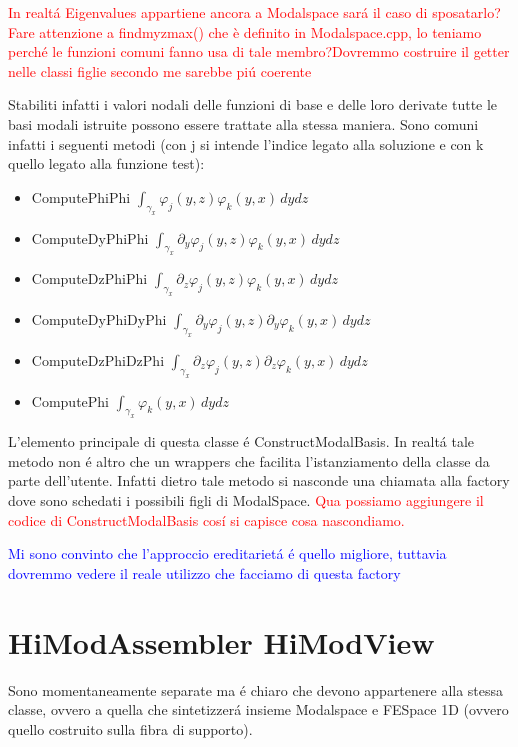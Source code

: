 \textcolor{red}{In realt\'a Eigenvalues appartiene ancora a Modalspace sar\'a il caso di sposatarlo?Fare attenzione a findmyzmax() che è definito in Modalspace.cpp, lo teniamo perch\'e le funzioni comuni fanno usa di tale membro?Dovremmo costruire il getter nelle classi figlie secondo me sarebbe pi\'u coerente}

Stabiliti infatti i valori nodali delle funzioni di base e delle loro derivate tutte le basi modali istruite possono essere trattate alla stessa maniera. Sono comuni infatti i seguenti metodi (con j si intende l'indice legato alla soluzione e con k quello legato alla funzione test):
\begin{itemize}
\item ComputePhiPhi $\int_{\gamma_x}\varphi_j(y,z)\varphi_k(y,x) \,dydz$
\item ComputeDyPhiPhi $\int_{\gamma_x} \partial_y \varphi_j(y,z)\varphi_k(y,x) \,dydz$
\item ComputeDzPhiPhi
$\int_{\gamma_x} \partial_z \varphi_j(y,z)\varphi_k(y,x) \,dydz$
\item ComputeDyPhiDyPhi $\int_{\gamma_x} \partial_y \varphi_j(y,z)\partial_y\varphi_k(y,x) \,dydz$
\item ComputeDzPhiDzPhi
$\int_{\gamma_x} \partial_z \varphi_j(y,z)\partial_z\varphi_k(y,x) \,dydz$
\item ComputePhi
$\int_{\gamma_x} \varphi_k(y,x) \,dydz$
\end{itemize}

L'elemento principale di questa classe \'e ConstructModalBasis. In realt\'a tale metodo non \'e altro che un wrappers che facilita l'istanziamento della classe da parte dell'utente. Infatti dietro tale metodo si nasconde una chiamata alla factory dove sono schedati i possibili figli di ModalSpace.
 \textcolor{red}{Qua possiamo aggiungere il codice di ConstructModalBasis cos\'i si capisce cosa nascondiamo.}
 
 \textcolor{blue}{Mi sono convinto che l'approccio ereditariet\'a \'e quello migliore, tuttavia dovremmo vedere il reale utilizzo che facciamo di questa factory}
 
\section{HiModAssembler  HiModView}
 
 Sono momentaneamente separate ma \'e chiaro che devono appartenere alla stessa classe, ovvero a quella che sintetizzer\'a insieme Modalspace e FESpace 1D (ovvero quello costruito sulla fibra di supporto).
 
